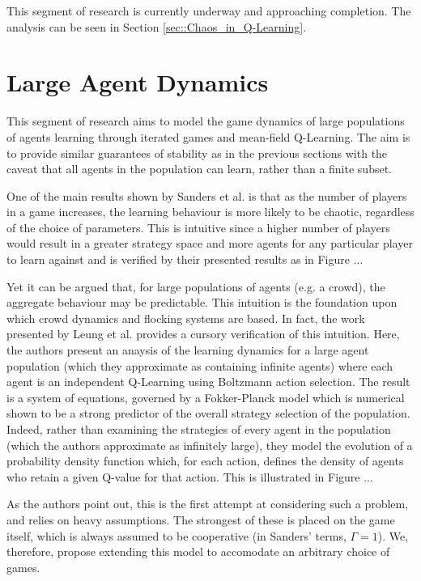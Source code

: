 \documentclass[.../main.tex]{subfiles}
\begin{document}
    This segment of research is currently underway and approaching completion. The analysis can be
    seen in Section \ref{sec::Chaos_in_Q-Learning}.

    \section{Large Agent Dynamics} \label{sec::Large_Agent_Dynamics}

    This segment of research aims to model the game dynamics of large populations of agents
    learning through iterated games and mean-field Q-Learning. The aim is to provide similar
    guarantees of stability as in the previous sections with the caveat that all agents in the
    population can learn, rather than a finite subset.

    One of the main results shown by Sanders et al. \cite{Sanders2018} is that as the number of
    players in a game increases, the learning behaviour is more likely to be chaotic, regardless of
    the choice of parameters. This is intuitive since a higher number of players would result in a
    greater strategy space and more agents for any particular player to learn against and is
    verified by their presented results as in Figure ...

    Yet it can be argued that, for large populations of agents (e.g. a crowd), the aggregate
    behaviour may be predictable. This intuition is the foundation upon which crowd dynamics and
    flocking systems are based. In fact, the work presented by Leung et al. \cite{Hu2019} provides a
    cursory verification of this intuition. Here, the authors present an anaysis of the learning
    dynamics for a large agent population (which they approximate as containing infinite agents)
    where each agent is an independent Q-Learning using Boltzmann action selection. The
    result is a system of equations, governed by a Fokker-Planck model which is numerical shown to be a 
    strong predictor of the overall strategy selection of the population. Indeed, rather than
    examining the strategies of every agent in the population (which the authors approximate as
    infinitely large), they model the evolution of a probability density function which, for each
    action, defines the density of agents who retain a given Q-value for that action. This is
    illustrated in Figure ...

   	As the authors point out, this is the first attempt at considering such a problem, and relies on
	heavy assumptions. The strongest of these is placed on the game itself, which is always
	assumed to be cooperative (in Sanders' terms, $\Gamma = 1$). We, therefore, propose extending
	this model to accomodate an arbitrary choice of games. 
\end{document}
